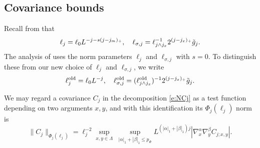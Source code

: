 
\subsection{Covariance bounds}
\label{sec:Cbds}

Recall from  that
\begin{equation}
\label{e:elldef}
\ell_j
	=
\ell_0 L^{-j - s (j - j_m)_+}, \quad
\ell_{\sigma,j}
	=
\ell_{j \wedge j_{x}}^{-1} 2^{(j - j_{x})_+} \tilde{g}_j.
\end{equation}
The analysis of \cite{BS-rg-IE,BS-rg-step} uses the norm parameters $\ell_j$ and $\ell_{\sigma,j}$ with $s = 0$.
To distinguish these from our
new choice  of $\ell_j$ and $\ell_{\sigma,j}$, we write
\begin{equation}
\label{e:ell-old}
    \ell_j^{\mathrm{old}} = \ell_0 L^{-j},
    \quad
    \ell_{\sigma,j}^{\mathrm{old}}  =
    (\ell_{j \wedge j_{x}}^{\rm old})^{-1}2^{(j - j_{x})_+}\tilde{g}_j.
\end{equation}

We may regard a covariance $C_j$ in the decomposition \eqref{e:NCj}
as a test function depending on
two arguments $x,y$, and with this identification its $\Phi_j(\ell_j)$
norm is
\begin{equation}
    \label{e:Phinorm}
    \|C_j\|_{\Phi_{j}(\ell_j)}  =
    \ell_j^{-2}
    \sup_{x,y\in \Lambda}
    \;
    \sup_{|\alpha|_1 + |\beta|_1 \le p_\Phi}
    L^{(|\alpha|_1+  |\beta|_1)j}
    |\nabla_x^{\alpha} \nabla_y^{\beta} C_{j;x,y}|.
\end{equation}

